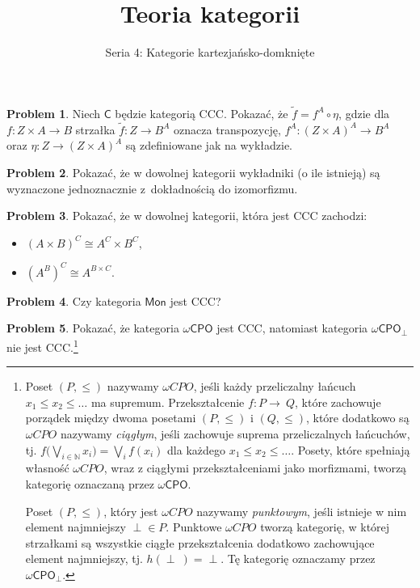 \documentclass[9pt]{amsart}
\title{Teoria kategorii}
\author{Seria 4: Kategorie kartezjańsko-domknięte}
\theoremstyle{plain}
\theoremstyle{definition}
\newtheorem{problem}{Problem}
\numberwithin{equation}{section}
\newcommand\blfootnote[1]{%
  \begingroup
  \renewcommand\thefootnote{}\footnote{#1}%
  \addtocounter{footnote}{-1}%
  \endgroup
}
\begin{document}
\maketitle
\thispagestyle{empty}

\begin{problem}
Niech $\mathsf{C}$ będzie kategorią CCC. Pokazać, że $\tilde{f} = f^A\circ \eta$, gdzie dla $f:Z\times A\to B$ 
strzałka $\tilde{f}:Z\to B^A$ oznacza transpozycję, $f^A:(Z\times A)^A\to B^A$ oraz $\eta:Z\to (Z\times A)^A$ są zdefiniowane 
jak na wykładzie.
\end{problem}

\begin{problem}
    Pokazać, że w dowolnej kategorii wykładniki (o ile istnieją) są wyznaczone jednoznacznie z~dokładnością do izomorfizmu. 
\end{problem}

\begin{problem}
Pokazać, że w dowolnej kategorii, która jest CCC zachodzi:
\begin{itemize}
\item $(A\times B)^C \cong A^C\times B^C$,
\item $(A^B)^C \cong A^{B\times C}$.
\end{itemize}
\end{problem}

\begin{problem}
Czy kategoria $\mathsf{Mon}$ jest CCC?
\end{problem}

\begin{problem}
Pokazać, że kategoria $\omega \mathsf{CPO}$ jest CCC, natomiast kategoria $\omega \mathsf{CPO}_\perp$ nie jest CCC.\footnote{Poset $(P,\leq)$ nazywamy $\omega CPO$, jeśli każdy przeliczalny łańcuch $x_1\leq x_2 \leq \dots$ ma supremum. Przekształcenie $f:P\to~Q$, które zachowuje porządek między dwoma posetami $(P,\leq)$ i $(Q,\leq)$, które dodatkowo są $\omega CPO$ nazywamy \emph{ciągłym}, jeśli zachowuje suprema przeliczalnych łańcuchów, tj. $f\Big(\bigvee_{i\in \mathbb{N}} x_i\Big) = \bigvee_{i} f(x_i)$ dla każdego $x_1\leq x_2\leq \ldots$. Posety, które spełniają własność $\omega CPO$, wraz z ciągłymi przekształceniami jako morfizmami, tworzą kategorię oznaczaną przez $\omega\mathsf{CPO}$. 

Poset $(P,\leq)$, który jest $\omega CPO$ nazywamy \emph{punktowym}, jeśli istnieje w nim element najmniejszy $\perp\in P$. Punktowe $\omega CPO$ tworzą kategorię, w której strzałkami są wszystkie ciągłe przekształcenia dodatkowo zachowujące element najmniejszy, tj. $h(\perp~)= \perp$. Tę kategorię oznaczamy przez $\omega \mathsf{CPO}_\perp$.}  
\end{problem}
\end{document}
